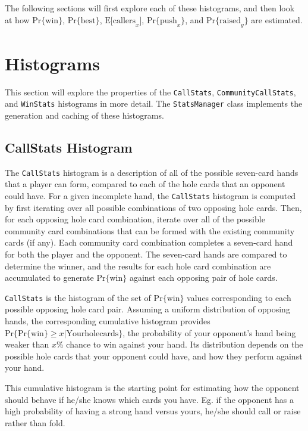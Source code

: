 The following sections will first explore each of these histograms, and then look at how $\mathrm{Pr\{win\}}$, $\mathrm{Pr\{best\}}$, $\mathrm{E[callers}_x]$, $\mathrm{Pr\{push}_x\}$, and $\mathrm{Pr\{raised}_y\}$ are estimated.

\section{Histograms}

This section will explore the properties of the \texttt{CallStats}, \texttt{CommunityCallStats}, and \texttt{WinStats} histograms in more detail.
The \texttt{StatsManager} class implements the generation and caching of these histograms.

\subsection{CallStats Histogram}
\label{sec:CallStats}

The \texttt{CallStats} histogram is a description of all of the possible seven-card hands that a player can form, compared to each of the hole cards that an opponent could have.
For a given incomplete hand, the \texttt{CallStats} histogram is computed by first iterating over all possible combinations of two opposing hole cards.
Then, for each opposing hole card combination, iterate over all of the possible community card combinations that can be formed with the existing community cards (if any).
Each community card combination completes a seven-card hand for both the player and the opponent.
The seven-card hands are compared to determine the winner, and the results for each hole card combination are accumulated to generate $\mathrm{Pr\{win\}}$ against each opposing pair of hole cards.

\texttt{CallStats} is the histogram of the set of $\mathrm{Pr\{win\}}$ values corresponding to each possible opposing hole card pair.
Assuming a uniform distribution of opposing hands, the corresponding cumulative histogram provides $\mathrm{Pr}\{\mathrm{Pr\{win\}} \ge x|\mathrm{Your hole cards}\}$, the probability of your opponent's hand being weaker than $x$\% chance to win against your hand.
Its distribution depends on the possible hole cards that your opponent could have, and how they perform against your hand.

This cumulative histogram is the starting point for estimating how the opponent should behave if he/she knows which cards you have.
Eg. if the opponent has a high probability of having a strong hand versus yours, he/she should call or raise rather than fold.


